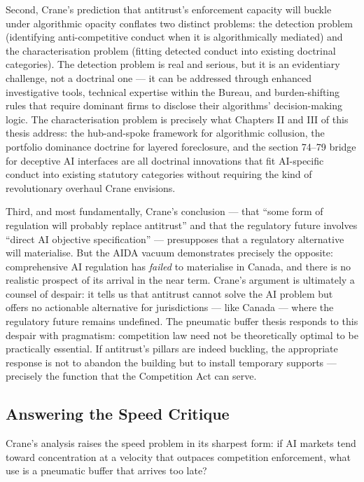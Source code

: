 Second, Crane's prediction that antitrust's enforcement capacity will buckle under algorithmic opacity conflates two distinct problems: the detection problem (identifying anti-competitive conduct when it is algorithmically mediated) and the characterisation problem (fitting detected conduct into existing doctrinal categories). The detection problem is real and serious, but it is an evidentiary challenge, not a doctrinal one --- it can be addressed through enhanced investigative tools, technical expertise within the Bureau, and burden-shifting rules that require dominant firms to disclose their algorithms' decision-making logic. The characterisation problem is precisely what Chapters II and III of this thesis address: the hub-and-spoke framework for algorithmic collusion, the portfolio dominance doctrine for layered foreclosure, and the section 74--79 bridge for deceptive AI interfaces are all doctrinal innovations that fit AI-specific conduct into existing statutory categories without requiring the kind of revolutionary overhaul Crane envisions.

Third, and most fundamentally, Crane's conclusion --- that ``some form of regulation will probably replace antitrust'' and that the regulatory future involves ``direct AI objective specification'' --- presupposes that a regulatory alternative will materialise. But the AIDA vacuum demonstrates precisely the opposite: comprehensive AI regulation has \textit{failed} to materialise in Canada, and there is no realistic prospect of its arrival in the near term. Crane's argument is ultimately a counsel of despair: it tells us that antitrust cannot solve the AI problem but offers no actionable alternative for jurisdictions --- like Canada --- where the regulatory future remains undefined. The pneumatic buffer thesis responds to this despair with pragmatism: competition law need not be theoretically optimal to be practically essential. If antitrust's pillars are indeed buckling, the appropriate response is not to abandon the building but to install temporary supports --- precisely the function that the Competition Act can serve.

\subsection{Answering the Speed Critique}

Crane's analysis raises the speed problem in its sharpest form: if AI markets tend toward concentration at a velocity that outpaces competition enforcement, what use is a pneumatic buffer that arrives too late?

